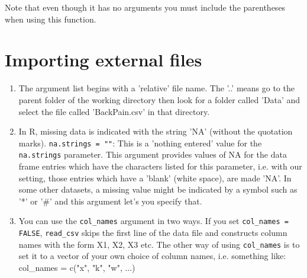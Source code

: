 \documentclass[titlepage]{book}\usepackage{knitr}
\begin{document}
Note that even though it has no arguments you must include the parentheses when using this function.

\section{Importing external files}


\begin{knitrout}
\color{fgcolor}
\end{knitrout}


\begin{enumerate}
\item The argument list begins with a 'relative' file name. The '..' means go to the parent folder of the working directory then look for a folder  called 'Data' and select the file called 'BackPain.csv' in that directory.

\item In R, missing data is indicated with the string 'NA' (without the quotation marks). \texttt{na.strings = ""}: This is a 'nothing entered' value for the \texttt{na.strings} parameter.  This argument provides values of NA for the data frame entries which have the characters listed for this parameter, i.e. with our setting, those entries which have a 'blank' (white space), are made 'NA'. In some other datasets, a missing value might be indicated by a symbol such as '*' or '\#' and this argument let's you specify that.


\item You can use the \texttt{col\_names} argument in two ways. If you set \texttt{col\_names = FALSE}, \texttt{read\_csv} skips the first line of the data file and constructs column names with the form X1, X2, X3 etc. The other way of using \texttt{col\_names} is to set it to a vector of your own choice of column names, i.e. something like: {col\_names = c("x", "k", "w", ...)}

\end{enumerate}
\end{document}
